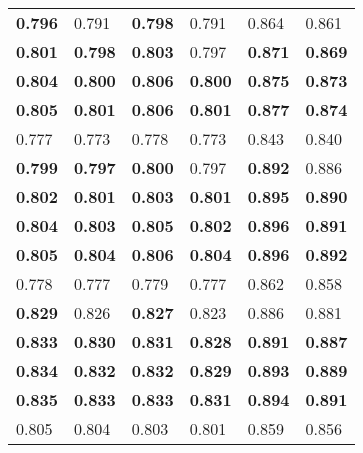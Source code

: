 \begin{tabular}{llllll}
\toprule
 \bfseries 0.796 & 0.791       & \bfseries 0.798 & 0.791       & 0.864       & 0.861       \\
 \bfseries 0.801 & \bfseries 0.798 & \bfseries 0.803 & 0.797       & \bfseries 0.871 & \bfseries 0.869 \\
 \bfseries 0.804 & \bfseries 0.800 & \bfseries 0.806 & \bfseries 0.800 & \bfseries 0.875 & \bfseries 0.873 \\
 \bfseries 0.805 & \bfseries 0.801 & \bfseries 0.806 & \bfseries 0.801 & \bfseries 0.877 & \bfseries 0.874 \\
 0.777       & 0.773       & 0.778       & 0.773       & 0.843       & 0.840       \\
 \bfseries 0.799 & \bfseries 0.797 & \bfseries 0.800 & 0.797       & \bfseries 0.892 & 0.886       \\
 \bfseries 0.802 & \bfseries 0.801 & \bfseries 0.803 & \bfseries 0.801 & \bfseries 0.895 & \bfseries 0.890 \\
 \bfseries 0.804 & \bfseries 0.803 & \bfseries 0.805 & \bfseries 0.802 & \bfseries 0.896 & \bfseries 0.891 \\
 \bfseries 0.805 & \bfseries 0.804 & \bfseries 0.806 & \bfseries 0.804 & \bfseries 0.896 & \bfseries 0.892 \\
 0.778       & 0.777       & 0.779       & 0.777       & 0.862       & 0.858       \\
 \bfseries 0.829 & 0.826       & \bfseries 0.827 & 0.823       & 0.886       & 0.881       \\
 \bfseries 0.833 & \bfseries 0.830 & \bfseries 0.831 & \bfseries 0.828 & \bfseries 0.891 & \bfseries 0.887 \\
 \bfseries 0.834 & \bfseries 0.832 & \bfseries 0.832 & \bfseries 0.829 & \bfseries 0.893 & \bfseries 0.889 \\
 \bfseries 0.835 & \bfseries 0.833 & \bfseries 0.833 & \bfseries 0.831 & \bfseries 0.894 & \bfseries 0.891 \\
 0.805       & 0.804       & 0.803       & 0.801       & 0.859       & 0.856       \\
\bottomrule
\end{tabular}